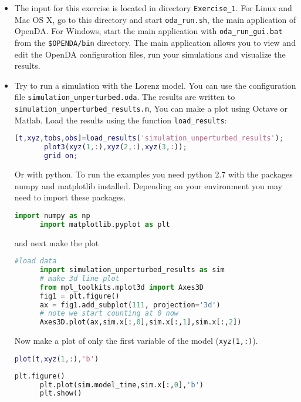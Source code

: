 \begin{itemize}
\item The input for this exercise is located in directory {\tt Exercise\_1}.
      For Linux and Mac OS X, go to this directory and start {\tt oda\_run.sh}, the
      main application of OpenDA. For Windows, start the main application with 
      {\tt oda\_run\_gui.bat} from the {\tt \$OPENDA/bin} directory. The main 
      application allows you to view and edit the OpenDA configuration files, run your
      simulations and visualize the results.
\item Try to run a simulation with the Lorenz model. You can use the
      configuration file {\tt simulation\_unperturbed.oda}. The results are
      written to {\tt simulation\_unperturbed\_results.m}, You can make a
      plot using Octave or Matlab. Load the results using the function
      {\tt load\_results}:
      \begin{lstlisting}[language=Matlab,frame=single,caption={Matlab}]
       [t,xyz,tobs,obs]=load_results('simulation_unperturbed_results');
       plot3(xyz(1,:),xyz(2,:),xyz(3,:));
       grid on;
      \end{lstlisting}
      Or with python. To run the examples you need python 2.7 with the packages numpy and matplotlib installed. Depending
      on your environment you may need to import these packages.
      \begin{lstlisting}[language=Python,frame=single,caption={Python initialize}]
      import numpy as np
      import matplotlib.pyplot as plt
      \end{lstlisting}
      and next make the plot
      \begin{lstlisting}[language=Python,frame=single,caption={Python}]
      #load data
      import simulation_unperturbed_results as sim
      # make 3d line plot
      from mpl_toolkits.mplot3d import Axes3D
      fig1 = plt.figure()
      ax = fig1.add_subplot(111, projection='3d')
      # note we start counting at 0 now
      Axes3D.plot(ax,sim.x[:,0],sim.x[:,1],sim.x[:,2])
      \end{lstlisting}
      
      Now make a plot of only the first variable of the model ({\tt xyz(1,:)}).
      \begin{lstlisting}[language=Matlab,frame=single,caption={Matlab}]
      plot(t,xyz(1,:),'b')
      \end{lstlisting}
      \begin{lstlisting}[language=Python,frame=single,caption={Python}]
      plt.figure()
      plt.plot(sim.model_time,sim.x[:,0],'b')
      plt.show()
      \end{lstlisting}
%


\end{itemize}
